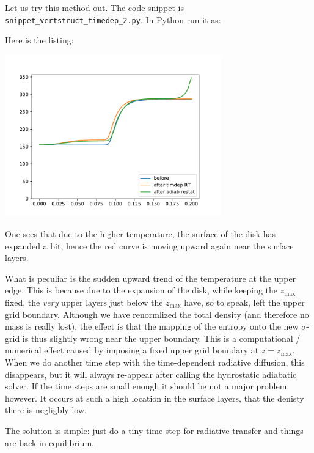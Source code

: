 \documentclass{book}
\newcommand{\code}[1]{{\small\tt #1}}
\begin{document}
Let us try this method out. The code snippet is
\code{snippet\_vertstruct\_timedep\_2.py}. In Python run it as:
\begin{codebox}
\end{codebox}
Here is the listing:

\centerline{\includegraphics[width=0.7\textwidth]{../snippets/fig_snippet_vertstruct_timedep_2_1.pdf}}

One sees that due to the higher temperature, the surface of the disk has expanded a
bit, hence the red curve is moving upward again near the surface layers.

What is peculiar is the sudden upward trend of the temperature at the upper
edge. This is because due to the expansion of the disk, while keeping the
$z_{\mathrm{max}}$ fixed, the {\em very} upper layers just below the
$z_{\mathrm{max}}$ have, so to speak, left the upper grid boundary. Although we have
renormlized the total density (and therefore no mass is really lost), the effect
is that the mapping of the entropy onto the new $\sigma$-grid is thus slightly wrong
near the upper boundary. This is a computational / numerical effect caused by
imposing a fixed upper grid boundary at $z=z_{\mathrm{max}}$. When we do another
time step with the time-dependent radiative diffusion, this disappears, but it
will always re-appear after calling the hydrostatic adiabatic solver. If the
time steps are small enough it should be not a major problem, however. It
occurs at such a high location in the surface layers, that the denisty there
is negligbly low.

The solution is simple: just do a tiny time step for radiative transfer and
things are back in equilibrium.
\end{document}
